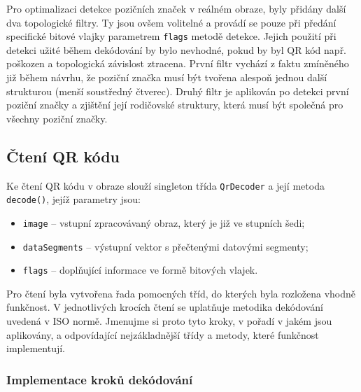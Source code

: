 Pro optimalizaci detekce pozičních značek v reálném obraze, byly přidány další
dva topologické filtry. Ty jsou ovšem volitelné a provádí se pouze při předání
specifické bitové vlajky parametrem \texttt{flags} metodě detekce. Jejich
použití při detekci užité během dekódování by bylo nevhodné, pokud by byl QR kód např.
poškozen a topologická závislost ztracena. První filtr vychází z faktu zmíněného
již během návrhu, že poziční značka musí být tvořena alespoň jednou další
strukturou (menší soustředný čtverec). Druhý filtr je aplikován po detekci první
poziční značky a zjištění její rodičovské struktury, která musí být společná pro
všechny poziční značky.

\subsection{Čtení QR kódu}
\label{cteniQrKoduBarcodesLibr}

Ke čtení QR kódu v obraze slouží singleton třída \texttt{QrDecoder} a její
metoda \texttt{decode()}, jejíž parametry jsou:

\begin{itemize}
  \item \texttt{image} -- vstupní zpracovávaný obraz, který je již ve stupních
  šedi;
  \item \texttt{dataSegments} -- výstupní vektor s přečtenými datovými segmenty;
  \item \texttt{flags} -- doplňující informace ve formě bitových vlajek.
\end{itemize}

Pro čtení byla vytvořena řada pomocných tříd, do kterých byla rozložena vhodně
funkčnost. V jednotlivých krocích čtení se uplatňuje metodika dekódování uvedená
v ISO normě. Jmenujme si proto tyto kroky, v pořadí v jakém jsou aplikovány, a
odpovídající nejzákladnější třídy a metody, které funkčnost implementují.

\subsubsection{Implementace kroků dekódování}

